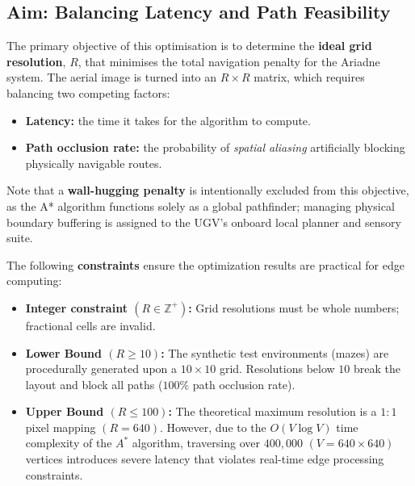 \documentclass[12pt, a4paper]{article}
\begin{document}
\subsection{Aim: Balancing Latency and Path Feasibility}

\quad The primary objective of this optimisation is to determine the \textbf{ideal grid resolution}, $R$, that minimises the total navigation penalty for the Ariadne system. The aerial image is turned into an $R \times R$ matrix, which requires balancing two competing factors:

\begin{itemize}
    \item \textbf{Latency:} the time it takes for the algorithm to compute.

    \item \textbf{Path occlusion rate:} the probability of \textit{spatial aliasing} artificially blocking physically navigable routes.
\end{itemize}

\hspace{-1.5em}Note that a \textbf{wall-hugging penalty} is intentionally excluded from this objective, as the A* algorithm functions solely as a global pathfinder; managing physical boundary buffering is assigned to the UGV’s onboard local planner and sensory suite.

\vspace{0.5cm}

\hspace{-1.5em}The following \textbf{constraints} ensure the optimization results are practical for edge computing:

\begin{itemize}
    \item \textbf{Integer constraint $(R \in \mathbb{Z}^{+})$:} Grid resolutions must be whole numbers; fractional cells are invalid.

    \item \textbf{Lower Bound $(R \ge 10)$:} The synthetic test environments (mazes) are procedurally generated upon a $10 \times 10$ grid. Resolutions below $10$ break the layout and block all paths ($100\%$ path occlusion rate).

    \item \textbf{Upper Bound $(R \le 100)$:} The theoretical maximum resolution is a $1:1$ pixel mapping $(R=640)$. However, due to the $O(V \log V)$ time complexity of the $A^*$ algorithm, traversing over $400,000$ $(V = 640 \times 640)$ vertices introduces severe latency that violates real-time edge processing constraints. 
\end{itemize}
\end{document}
